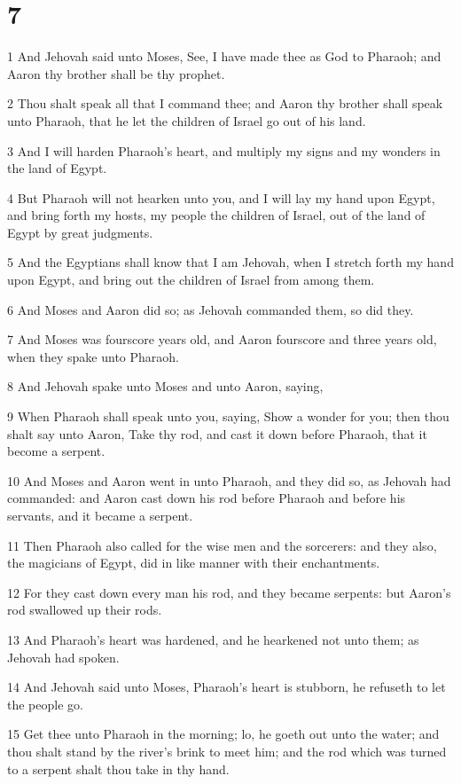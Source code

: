 \chapter{7}

\par 1 And Jehovah said unto Moses, See, I have made thee as God to Pharaoh; and Aaron thy brother shall be thy prophet.
\par 2 Thou shalt speak all that I command thee; and Aaron thy brother shall speak unto Pharaoh, that he let the children of Israel go out of his land.
\par 3 And I will harden Pharaoh's heart, and multiply my signs and my wonders in the land of Egypt.
\par 4 But Pharaoh will not hearken unto you, and I will lay my hand upon Egypt, and bring forth my hosts, my people the children of Israel, out of the land of Egypt by great judgments.
\par 5 And the Egyptians shall know that I am Jehovah, when I stretch forth my hand upon Egypt, and bring out the children of Israel from among them.
\par 6 And Moses and Aaron did so; as Jehovah commanded them, so did they.
\par 7 And Moses was fourscore years old, and Aaron fourscore and three years old, when they spake unto Pharaoh.
\par 8 And Jehovah spake unto Moses and unto Aaron, saying,
\par 9 When Pharaoh shall speak unto you, saying, Show a wonder for you; then thou shalt say unto Aaron, Take thy rod, and cast it down before Pharaoh, that it become a serpent.
\par 10 And Moses and Aaron went in unto Pharaoh, and they did so, as Jehovah had commanded: and Aaron cast down his rod before Pharaoh and before his servants, and it became a serpent.
\par 11 Then Pharaoh also called for the wise men and the sorcerers: and they also, the magicians of Egypt, did in like manner with their enchantments.
\par 12 For they cast down every man his rod, and they became serpents: but Aaron's rod swallowed up their rods.
\par 13 And Pharaoh's heart was hardened, and he hearkened not unto them; as Jehovah had spoken.
\par 14 And Jehovah said unto Moses, Pharaoh's heart is stubborn, he refuseth to let the people go.
\par 15 Get thee unto Pharaoh in the morning; lo, he goeth out unto the water; and thou shalt stand by the river's brink to meet him; and the rod which was turned to a serpent shalt thou take in thy hand.
